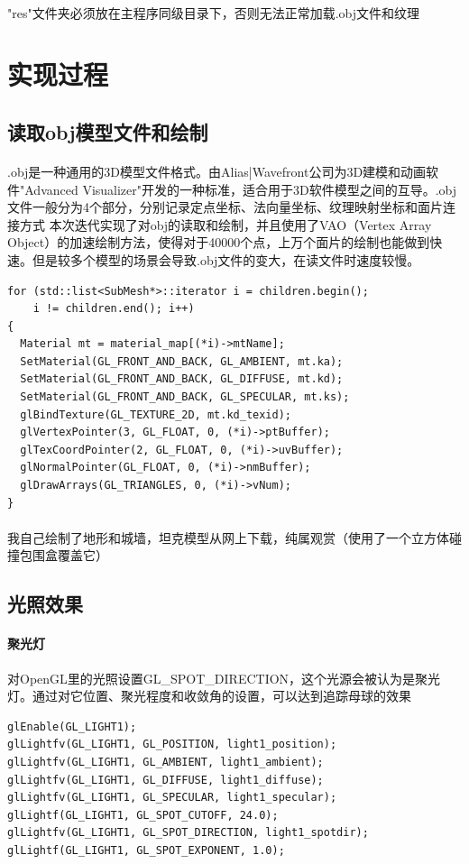 \documentclass{article}
\begin{document}
            \paragraph{}
                "res"文件夹必须放在主程序同级目录下，否则无法正常加载.obj文件和纹理
    \section{实现过程}
        \subsection{读取obj模型文件和绘制}
            \paragraph{}
                .obj是一种通用的3D模型文件格式。由Alias|Wavefront公司为3D建模和动画软件"Advanced Visualizer"开发的一种标准，适合用于3D软件模型之间的互导。.obj文件一般分为4个部分，分别记录定点坐标、法向量坐标、纹理映射坐标和面片连接方式  
                本次迭代实现了对obj的读取和绘制，并且使用了VAO（Vertex Array Object）的加速绘制方法，使得对于40000个点，上万个面片的绘制也能做到快速。但是较多个模型的场景会导致.obj文件的变大，在读文件时速度较慢。
                \begin{lstlisting}[language={[ANSI]C}]
for (std::list<SubMesh*>::iterator i = children.begin(); 
    i != children.end(); i++) 
{
  Material mt = material_map[(*i)->mtName];
  SetMaterial(GL_FRONT_AND_BACK, GL_AMBIENT, mt.ka);
  SetMaterial(GL_FRONT_AND_BACK, GL_DIFFUSE, mt.kd);
  SetMaterial(GL_FRONT_AND_BACK, GL_SPECULAR, mt.ks);
  glBindTexture(GL_TEXTURE_2D, mt.kd_texid);
  glVertexPointer(3, GL_FLOAT, 0, (*i)->ptBuffer);
  glTexCoordPointer(2, GL_FLOAT, 0, (*i)->uvBuffer);
  glNormalPointer(GL_FLOAT, 0, (*i)->nmBuffer);
  glDrawArrays(GL_TRIANGLES, 0, (*i)->vNum);
}
                \end{lstlisting}
            \paragraph{}我自己绘制了地形和城墙，坦克模型从网上下载，纯属观赏（使用了一个立方体碰撞包围盒覆盖它）
        \subsection{光照效果}
            \paragraph{聚光灯}对OpenGL里的光照设置GL\_SPOT\_DIRECTION，这个光源会被认为是聚光灯。通过对它位置、聚光程度和收敛角的设置，可以达到追踪母球的效果
            \begin{lstlisting}[language={[ANSI]C}]
glEnable(GL_LIGHT1);
glLightfv(GL_LIGHT1, GL_POSITION, light1_position);
glLightfv(GL_LIGHT1, GL_AMBIENT, light1_ambient);
glLightfv(GL_LIGHT1, GL_DIFFUSE, light1_diffuse);
glLightfv(GL_LIGHT1, GL_SPECULAR, light1_specular);
glLightf(GL_LIGHT1, GL_SPOT_CUTOFF, 24.0);
glLightfv(GL_LIGHT1, GL_SPOT_DIRECTION, light1_spotdir);
glLightf(GL_LIGHT1, GL_SPOT_EXPONENT, 1.0); 
            \end{lstlisting}
\end{document}
